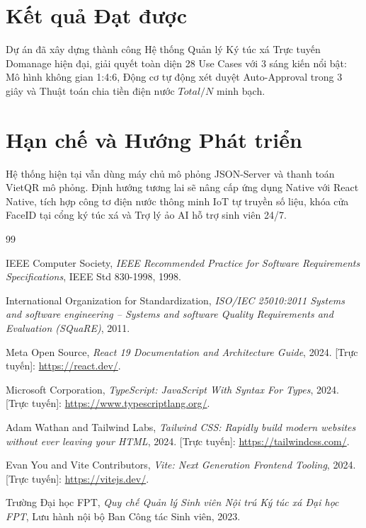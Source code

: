 \documentclass[12pt,a4paper,oneside]{report}
\begin{document}
\section{Kết quả Đạt được}
Dự án đã xây dựng thành công Hệ thống Quản lý Ký túc xá Trực tuyến Domanage hiện đại, giải quyết toàn diện 28 Use Cases với 3 sáng kiến nổi bật: Mô hình không gian 1:4:6, Động cơ tự động xét duyệt Auto-Approval trong 3 giây và Thuật toán chia tiền điện nước $Total/N$ minh bạch.

\section{Hạn chế và Hướng Phát triển}
Hệ thống hiện tại vẫn dùng máy chủ mô phỏng JSON-Server và thanh toán VietQR mô phỏng. Định hướng tương lai sẽ nâng cấp ứng dụng Native với React Native, tích hợp công tơ điện nước thông minh IoT tự truyền số liệu, khóa cửa FaceID tại cổng ký túc xá và Trợ lý ảo AI hỗ trợ sinh viên 24/7.

\newpage
{}
\begin{thebibliography}{99}

IEEE Computer Society, \emph{IEEE Recommended Practice for Software Requirements Specifications}, IEEE Std 830-1998, 1998.

International Organization for Standardization, \emph{ISO/IEC 25010:2011 Systems and software engineering -- Systems and software Quality Requirements and Evaluation (SQuaRE)}, 2011.

Meta Open Source, \emph{React 19 Documentation and Architecture Guide}, 2024. [Trực tuyến]: \url{https://react.dev/}.

Microsoft Corporation, \emph{TypeScript: JavaScript With Syntax For Types}, 2024. [Trực tuyến]: \url{https://www.typescriptlang.org/}.

Adam Wathan and Tailwind Labs, \emph{Tailwind CSS: Rapidly build modern websites without ever leaving your HTML}, 2024. [Trực tuyến]: \url{https://tailwindcss.com/}.

Evan You and Vite Contributors, \emph{Vite: Next Generation Frontend Tooling}, 2024. [Trực tuyến]: \url{https://vitejs.dev/}.

Trường Đại học FPT, \emph{Quy chế Quản lý Sinh viên Nội trú Ký túc xá Đại học FPT}, Lưu hành nội bộ Ban Công tác Sinh viên, 2023.

\end{thebibliography}
\end{document}

